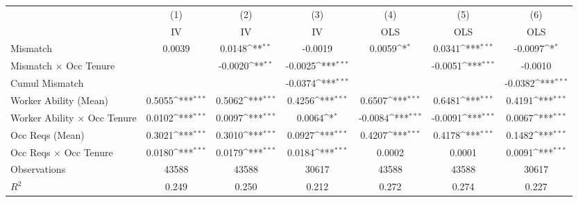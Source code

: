 {
\def\sym#1{\ifmmode^{#1}\else\(^{#1}\)\fi}
\begin{tabular}{l*{6}{c}}
\hline  
                    &\multicolumn{1}{c}{(1)}&\multicolumn{1}{c}{(2)}&\multicolumn{1}{c}{(3)}&\multicolumn{1}{c}{(4)}&\multicolumn{1}{c}{(5)}&\multicolumn{1}{c}{(6)}\\
                    &\multicolumn{1}{c}{IV}&\multicolumn{1}{c}{IV}&\multicolumn{1}{c}{IV}&\multicolumn{1}{c}{OLS}&\multicolumn{1}{c}{OLS}&\multicolumn{1}{c}{OLS}\\
\hline  
Mismatch            &      0.0039         &      0.0148\sym{**} &     -0.0019         &      0.0059\sym{*}  &      0.0341\sym{***}&     -0.0097\sym{*}  \\
[1em]
Mismatch $\times$ Occ Tenure&                     &     -0.0020\sym{**} &     -0.0025\sym{***}&                     &     -0.0051\sym{***}&     -0.0010         \\
[1em]
Cumul Mismatch      &                     &                     &     -0.0374\sym{***}&                     &                     &     -0.0382\sym{***}\\
[1em]
Worker Ability (Mean)&      0.5055\sym{***}&      0.5062\sym{***}&      0.4256\sym{***}&      0.6507\sym{***}&      0.6481\sym{***}&      0.4191\sym{***}\\
[1em]
Worker Ability $\times$ Occ Tenure&      0.0102\sym{***}&      0.0097\sym{***}&      0.0064\sym{*}  &     -0.0084\sym{***}&     -0.0091\sym{***}&      0.0067\sym{***}\\
[1em]
Occ Reqs (Mean)     &      0.3021\sym{***}&      0.3010\sym{***}&      0.0927\sym{***}&      0.4207\sym{***}&      0.4178\sym{***}&      0.1482\sym{***}\\
[1em]
Occ Reqs $\times$ Occ Tenure&      0.0180\sym{***}&      0.0179\sym{***}&      0.0184\sym{***}&      0.0002         &      0.0001         &      0.0091\sym{***}\\
\hline  
Observations        &       43588         &       43588         &       30617         &       43588         &       43588         &       30617         \\
\(R^{2}\)           &       0.249         &       0.250         &       0.212         &       0.272         &       0.274         &       0.227         \\
\hline  
\end{tabular}
}
